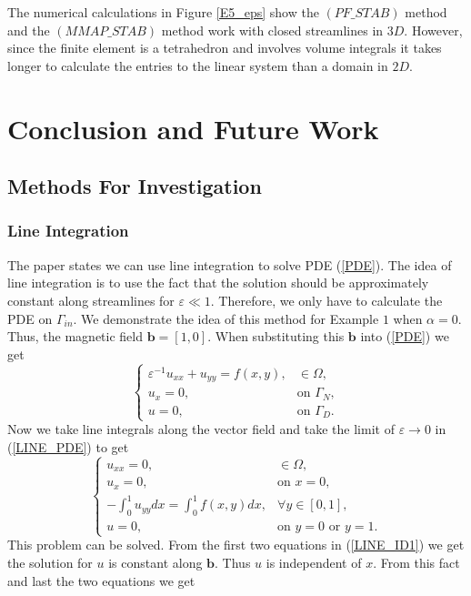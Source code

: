\documentclass[12pt]{ociamthesis}
\begin{document}
The numerical calculations in Figure \ref{E5_eps} show the $(PF\_STAB)$ method and the $(MMAP\_STAB)$ method work with closed streamlines in $3D$. However, since the finite element is a tetrahedron and involves volume integrals it takes longer to calculate the entries to the linear system than a domain in $2D$.

\chapter{Conclusion and Future Work}

\section{Methods For Investigation}

\subsection{Line Integration}
The paper \cite{LINE_INT} states we can use line integration to solve PDE (\ref{PDE}).  The idea of line integration is to use the fact that the solution should be approximately constant along streamlines for $\varepsilon \ll 1$. Therefore, we only have to calculate the PDE on $\Gamma_{in}$. We demonstrate the idea of this method for Example $1$ when $\alpha=0$. Thus, the magnetic field $\mathbf{b} = [1, 0]$. When substituting this $\mathbf{b}$ into (\ref{PDE}) we get 
\begin{equation} \label{LINE_PDE}
\begin{cases}
\varepsilon^{-1}u_{xx} + u_{yy} = f(x,y), &\in \Omega,\\
u_x = 0, &\text{on } \Gamma_{N},\\
u = 0, &\text{on } \Gamma_{D}.
\end{cases}
\end{equation}
Now we take line integrals along the vector field and take the limit of $\varepsilon \rightarrow 0$ in (\ref{LINE_PDE}) to get
\begin{equation} \label{LINE_ID1}
\begin{cases}
u_{xx} = 0, &\in \Omega,\\
u_{x} = 0, & \text{on }x=0,\\
-\int_0^1 u_{yy} dx = \int_0^1f(x,y)dx, &\forall y \in [0,1],\\
u = 0, &\text{on } y=0 \text{ or } y=1.
\end{cases}
\end{equation}
This problem can be solved. From the first two equations in (\ref{LINE_ID1}) we get the solution for $u$ is constant along $\mathbf{b}$. Thus $u$ is independent of $x$. From this fact and last the two equations we get
\end{document}
